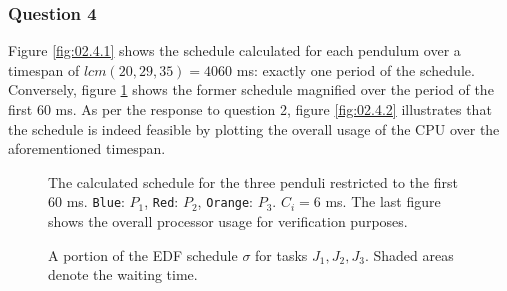 \subsubsection{Question 4}

Figure \ref{fig:02.4.1} shows the schedule calculated for each pendulum over a
timespan of $lcm(20,29,35) = 4060$ ms: exactly one period of the schedule.
Conversely, figure \ref{fig:02.4.1.small} shows the former schedule magnified
over the period of the first 60 ms.
As per the response to question 2, figure \ref{fig:02.4.2} illustrates that the
schedule is indeed feasible by plotting the overall usage of the CPU over the
aforementioned timespan.


\begin{sidewaysfigure}

  \begin{figure}[H]\centering
    \scalebox{1}{}
    \caption{The calculated schedule for the three penduli restricted to the first
        60 ms. \texttt{Blue}: $P_1$, \texttt{Red}: $P_2$,
        \texttt{Orange}: $P_3$. $C_i = 6$ ms. The last figure shows the overall
      processor usage for verification purposes.}
    \label{fig:02.4.1.small}
  \end{figure}

  \begin{figure}[H]\centering
    \scalebox{0.7}{}
    \caption{A portion of the EDF schedule $\sigma$ for tasks $J_1, J_2, J_3$.
      Shaded areas denote the waiting time.}
    \label{fig:edf_6}
  \end{figure}

\end{sidewaysfigure}

\noindent{}
